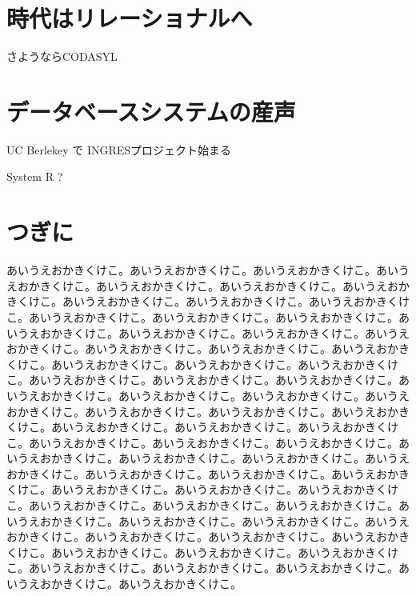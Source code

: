\section{時代はリレーショナルへ}

さようならCODASYL

\section{データベースシステムの産声}

UC Berlekey で INGRESプロジェクト始まる

System R ?

\section{つぎに}

\lettrine{あ}
いうえおかきくけこ。あいうえおかきくけこ。あいうえおかきくけこ。あいうえおかきくけこ。あいうえおかきくけこ。あいうえおかきくけこ。あいうえおかきくけこ。あいうえおかきくけこ。あいうえおかきくけこ。あいうえおかきくけこ。あいうえおかきくけこ。あいうえおかきくけこ。あいうえおかきくけこ。あいうえおかきくけこ。あいうえおかきくけこ。あいうえおかきくけこ。あいうえおかきくけこ。あいうえおかきくけこ。あいうえおかきくけこ。あいうえおかきくけこ。あいうえおかきくけこ。あいうえおかきくけこ。あいうえおかきくけこ。あいうえおかきくけこ。あいうえおかきくけこ。あいうえおかきくけこ。あいうえおかきくけこ。あいうえおかきくけこ。あいうえおかきくけこ。あいうえおかきくけこ。あいうえおかきくけこ。あいうえおかきくけこ。あいうえおかきくけこ。あいうえおかきくけこ。あいうえおかきくけこ。あいうえおかきくけこ。あいうえおかきくけこ。あいうえおかきくけこ。あいうえおかきくけこ。あいうえおかきくけこ。あいうえおかきくけこ。あいうえおかきくけこ。あいうえおかきくけこ。あいうえおかきくけこ。あいうえおかきくけこ。あいうえおかきくけこ。あいうえおかきくけこ。あいうえおかきくけこ。あいうえおかきくけこ。あいうえおかきくけこ。あいうえおかきくけこ。あいうえおかきくけこ。あいうえおかきくけこ。あいうえおかきくけこ。あいうえおかきくけこ。あいうえおかきくけこ。あいうえおかきくけこ。あいうえおかきくけこ。あいうえおかきくけこ。あいうえおかきくけこ。あいうえおかきくけこ。あいうえおかきくけこ。あいうえおかきくけこ。あいうえおかきくけこ。あいうえおかきくけこ。あいうえおかきくけこ。あいうえおかきくけこ。
